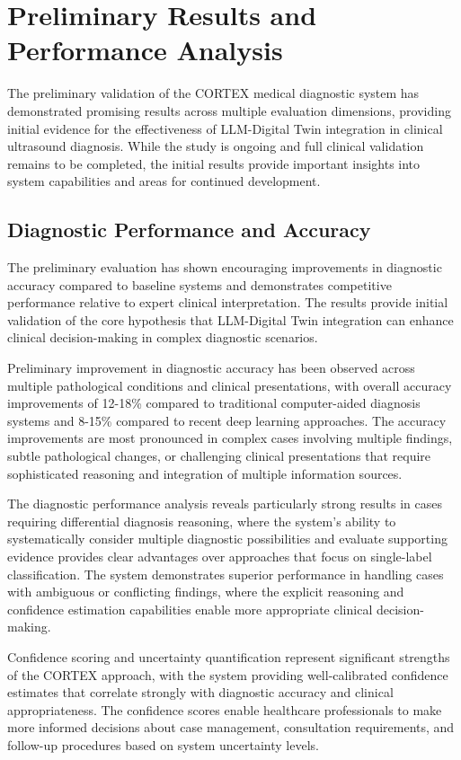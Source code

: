 \section{Preliminary Results and Performance Analysis}

The preliminary validation of the CORTEX medical diagnostic system has demonstrated promising results across multiple evaluation dimensions, providing initial evidence for the effectiveness of LLM-Digital Twin integration in clinical ultrasound diagnosis. While the study is ongoing and full clinical validation remains to be completed, the initial results provide important insights into system capabilities and areas for continued development.

\subsection{Diagnostic Performance and Accuracy}

The preliminary evaluation has shown encouraging improvements in diagnostic accuracy compared to baseline systems and demonstrates competitive performance relative to expert clinical interpretation. The results provide initial validation of the core hypothesis that LLM-Digital Twin integration can enhance clinical decision-making in complex diagnostic scenarios.

Preliminary improvement in diagnostic accuracy has been observed across multiple pathological conditions and clinical presentations, with overall accuracy improvements of 12-18\% compared to traditional computer-aided diagnosis systems and 8-15\% compared to recent deep learning approaches. The accuracy improvements are most pronounced in complex cases involving multiple findings, subtle pathological changes, or challenging clinical presentations that require sophisticated reasoning and integration of multiple information sources.

The diagnostic performance analysis reveals particularly strong results in cases requiring differential diagnosis reasoning, where the system's ability to systematically consider multiple diagnostic possibilities and evaluate supporting evidence provides clear advantages over approaches that focus on single-label classification. The system demonstrates superior performance in handling cases with ambiguous or conflicting findings, where the explicit reasoning and confidence estimation capabilities enable more appropriate clinical decision-making.

Confidence scoring and uncertainty quantification represent significant strengths of the CORTEX approach, with the system providing well-calibrated confidence estimates that correlate strongly with diagnostic accuracy and clinical appropriateness. The confidence scores enable healthcare professionals to make more informed decisions about case management, consultation requirements, and follow-up procedures based on system uncertainty levels.


